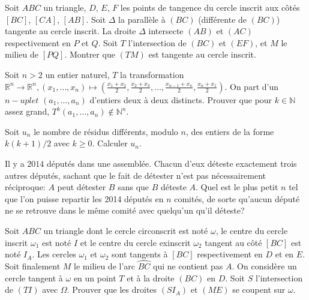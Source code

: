 \begin{exo}{}
Soit $ABC$ un triangle, $D$, $E$, $F$ les points de tangence du cercle inscrit aux côtés $[BC]$, $[CA]$, $[AB]$. Soit $\Delta$ la parallèle à $(BC)$ (différente de $(BC)$) tangente au cercle inscrit. La droite $\Delta$ intersecte $(AB)$ et $(AC)$ respectivement en $P$ et $Q$. Soit $T$ l'intersection de $(BC)$ et $(EF)$, et $M$ le milieu de $[PQ]$. Montrer que $(TM)$ est tangente au cercle inscrit. 
\end {exo}

\begin{exo}{ }Soit $n>2$ un entier naturel, $T$ la transformation $\mathbb{R}^n\rightarrow \mathbb{R}^n,(x_1,\ldots,x_n)\mapsto (\frac{x_1+x_2}{2},\frac{x_2+x_3}{2},\ldots,\frac{x_{n-1}+x_{n}}{2},\frac{x_n+x_1}{2})$. On part d'un $n-uplet$ $(a_1,\ldots,a_n)$ d'entiers deux à deux distincts. Prouver que pour $k\in \mathbb{N}$ assez grand, $T^k(a_1,\ldots,a_n)\notin \mathbb{N}^n$.
\end{exo}

\begin{exo}{}Soit $u_{n}$ le nombre de résidus différents, modulo $n$, des entiers de la forme $k(k+1)/2$ avec $k \geq 0$. Calculer $u_{n}$.
\end{exo}

\begin{exo}{}Il y a $2014$ députés dans une assemblée. Chacun d'eux déteste exactement trois autres députés, sachant que le fait de détester n'est pas nécessairement réciproque: $A$ peut détester $B$ sans que $B$ déteste $A$. Quel est le plus petit $n$ tel que l'on puisse repartir les 2014 députés en $n$ comités, de sorte qu'aucun député ne se retrouve dans le même comité avec quelqu'un qu'il déteste?
\end{exo}

\begin{exo}{}
Soit $ABC$ un triangle dont le cercle circonscrit est noté $ \omega$, le centre du cercle inscrit $ \omega_{1}$ est noté $I$ et le centre du cercle exinscrit $ \omega_{2}$ tangent au côté $[BC]$ est noté $I_{A}$. Les cercles $ \omega_{1}$ et $ \omega_{2}$ sont tangents à $[BC]$ respectivement en $D$ et en $E$. Soit finalement $M$ le milieu de l'arc $ \wideparen {BC}$ qui ne contient pas $A$. On considère un cercle tangent à $ \omega$ en un point $T$ et à la droite $(BC)$ en $D$. Soit $S$ l'intersection  de $(TI)$ avec $ \Omega$. Prouver que les droites $(SI_{A})$ et $ (ME)$ se coupent sur $ \omega$.
\end{exo}

